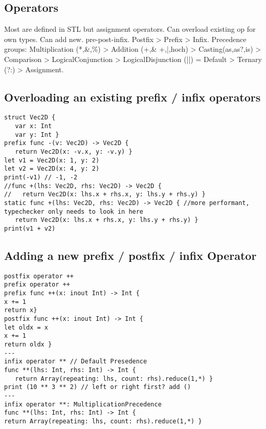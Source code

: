 \subsection{Operators}
Most are defined in STL but assignment operators. Can overload existing op for own types. Can add new. pre-post-infix.
Postfix > Prefix > Infix. Precedence groups: Multiplication (*,\&,\%) > Addition (+,\& +,|,hoch) > Casting(as,as?,is) > Comparison > LogicalConjunction > LogicalDisjunction (||)  = Default >  Ternary (?:) > Assignment.

\subsection{Overloading an existing prefix / infix operators}
\begin{lstlisting}
struct Vec2D {
   var x: Int
   var y: Int }
prefix func -(v: Vec2D) -> Vec2D {
   return Vec2D(x: -v.x, y: -v.y) }
let v1 = Vec2D(x: 1, y: 2)
let v2 = Vec2D(x: 4, y: 2)
print(-v1) // -1, -2
//func +(lhs: Vec2D, rhs: Vec2D) -> Vec2D {
//   return Vec2D(x: lhs.x + rhs.x, y: lhs.y + rhs.y) }
static func +(lhs: Vec2D, rhs: Vec2D) -> Vec2D { //more performant, typechecker only needs to look in here
   return Vec2D(x: lhs.x + rhs.x, y: lhs.y + rhs.y) }
print(v1 + v2)
\end{lstlisting}

\subsection{Adding a new prefix / postfix / infix Operator}
\begin{lstlisting}
postfix operator ++
prefix operator ++
prefix func ++(x: inout Int) -> Int {
x += 1
return x}
postfix func ++(x: inout Int) -> Int {
let oldx = x
x += 1
return oldx }
---
infix operator ** // Default Presedence
func **(lhs: Int, rhs: Int) -> Int {
   return Array(repeating: lhs, count: rhs).reduce(1,*) }
print (10 ** 3 ** 2) // left or right first? add ()
---
infix operator **: MultiplicationPrecedence
func **(lhs: Int, rhs: Int) -> Int {
return Array(repeating: lhs, count: rhs).reduce(1,*) }
\end{lstlisting}


